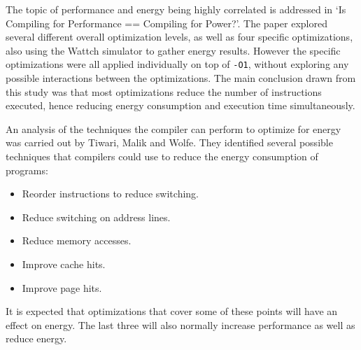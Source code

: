 \documentclass[twocolumn]{article}
\begin{document}
The topic of performance and energy being highly correlated is addressed in `Is Compiling for Performance == Compiling for Power?'\cite{CompilingForPerformancePower}. The paper explored several different overall optimization levels, as well as four specific optimizations, also using the Wattch simulator to gather energy results. However the specific optimizations were all applied individually on top of \texttt{-O1}, without exploring any possible interactions between the optimizations. The main conclusion drawn from this study was that most optimizations reduce the number of instructions executed, hence reducing energy consumption and execution time simultaneously.

An analysis of the techniques the compiler can perform to optimize for energy was carried out by Tiwari, Malik and Wolfe\cite{CompilationTechniquesForLowEnergy}. They identified several possible techniques that compilers could use to reduce the energy consumption of programs:
\begin{itemize}
	\setlength{\itemsep}{0em}
	\vspace{-1mm}

	\item Reorder instructions to reduce switching.
	\item Reduce switching on address lines.
	\item Reduce memory accesses.
	\item Improve cache hits.
	\item Improve page hits.
\end{itemize}

It is expected that optimizations that cover some of these points will have an effect on energy. The last three will also normally increase performance as well as reduce energy.
\end{document}

